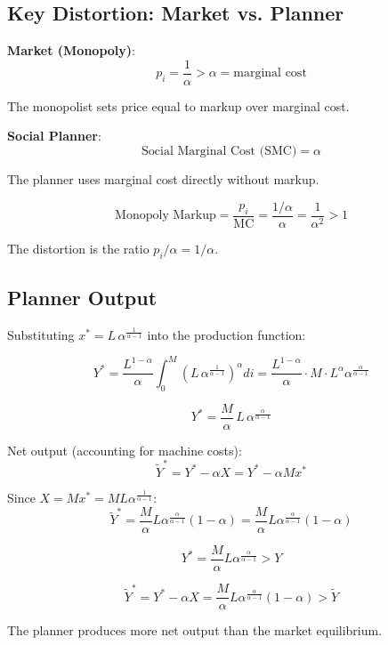 \subsection{Key Distortion: Market vs. Planner}

\begin{derivationbox}
\textbf{Market (Monopoly)}:
\[
p_i = \frac{1}{\alpha} > \alpha = \text{marginal cost}
\]

The monopolist sets price equal to markup over marginal cost.

\medskip
\textbf{Social Planner}:
\[
\text{Social Marginal Cost (SMC)} = \alpha
\]

The planner uses marginal cost directly without markup.
\end{derivationbox}

\begin{resultbox}
\[
\boxed{\text{Monopoly Markup} = \frac{p_i}{\text{MC}} = \frac{1/\alpha}{\alpha} = \frac{1}{\alpha^2} > 1}
\]

The distortion is the ratio $p_i / \alpha = 1/\alpha$.
\end{resultbox}

\subsection{Planner Output}

\begin{derivationbox}
Substituting $x^* = L \, \alpha^{\frac{1}{\alpha-1}}$ into the production function:

\[
Y^* = \frac{L^{1-\alpha}}{\alpha} \int_0^M \left(L \, \alpha^{\frac{1}{\alpha-1}}\right)^\alpha di
     = \frac{L^{1-\alpha}}{\alpha} \cdot M \cdot L^\alpha \alpha^{\frac{\alpha}{\alpha-1}}
\]

\[
Y^* = \frac{M}{\alpha} \, L \, \alpha^{\frac{\alpha}{\alpha-1}}
\tag{Planner-Y^*}
\]

\medskip
Net output (accounting for machine costs):
\[
\tilde{Y}^* = Y^* - \alpha X = Y^* - \alpha M x^*
\]

Since $X = M x^* = M L \alpha^{\frac{1}{\alpha-1}}$:
\[
\tilde{Y}^* = \frac{M}{\alpha} L \alpha^{\frac{\alpha}{\alpha-1}} (1 - \alpha)
            = \frac{M}{\alpha} L \alpha^{\frac{\alpha}{\alpha-1}} (1-\alpha)
\]
\end{derivationbox}

\begin{resultbox}
\[
\boxed{Y^* = \frac{M}{\alpha} L \alpha^{\frac{\alpha}{\alpha-1}} > Y}
\]

\[
\boxed{\tilde{Y}^* = Y^* - \alpha X = \frac{M}{\alpha} L \alpha^{\frac{\alpha}{\alpha-1}} (1-\alpha) > \tilde{Y}}
\]

The planner produces more net output than the market equilibrium.
\end{resultbox}

